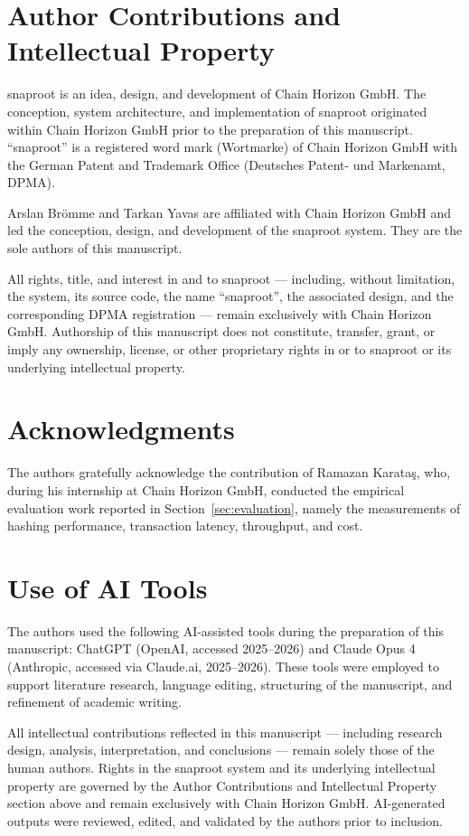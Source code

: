 \documentclass[11pt,a4paper]{article}
\begin{document}
\section*{Author Contributions and Intellectual Property}

snaproot is an idea, design, and development of Chain Horizon GmbH.
The conception, system architecture, and implementation of snaproot
originated within Chain Horizon GmbH prior to the preparation of this
manuscript. ``snaproot'' is a registered word mark (Wortmarke) of
Chain Horizon GmbH with the German Patent and Trademark Office
(Deutsches Patent- und Markenamt, DPMA).

Arslan Br\"omme and Tarkan Yavas are affiliated with Chain Horizon
GmbH and led the conception, design, and development of the snaproot
system. They are the sole authors of this manuscript.

All rights, title, and interest in and to snaproot --- including,
without limitation, the system, its source code, the name
``snaproot'', the associated design, and the corresponding DPMA
registration --- remain exclusively with Chain Horizon GmbH.
Authorship of this manuscript does not constitute, transfer, grant,
or imply any ownership, license, or other proprietary rights in or to
snaproot or its underlying intellectual property.

\section*{Acknowledgments}

The authors gratefully acknowledge the contribution of Ramazan
Karata\c{s}, who, during his internship at Chain Horizon GmbH,
conducted the empirical evaluation work reported in
Section~\ref{sec:evaluation}, namely the measurements of hashing
performance, transaction latency, throughput, and cost.

\section*{Use of AI Tools}

The authors used the following AI-assisted tools during the preparation
of this manuscript: ChatGPT (OpenAI, accessed 2025--2026) and Claude Opus 4
(Anthropic, accessed via Claude.ai, 2025--2026). These tools were employed to
support literature research, language editing, structuring of the
manuscript, and refinement of academic writing.

All intellectual contributions reflected in this manuscript ---
including research design, analysis, interpretation, and conclusions
--- remain solely those of the human authors. Rights in the snaproot
system and its underlying intellectual property are governed by the
Author Contributions and Intellectual Property section above and
remain exclusively with Chain Horizon GmbH. AI-generated outputs were
reviewed, edited, and validated by the authors prior to inclusion.



\end{document}
